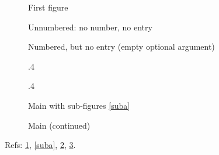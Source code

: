 \documentclass{article}
\begin{document}
\listoffigures
\begin{figure}[h]
  \caption{First figure}\label{first}
\end{figure}
\begin{figure}[h]
  \caption*{Unnumbered: no number, no entry}
\end{figure}
\begin{figure}[h]
  \caption[]{Numbered, but no entry (empty optional argument)}
\end{figure}
\begin{figure}[h]
  \centering
  \begin{subfig}{.4\linewidth}\caption{Sub A}\label{suba}\end{subfig}
  \begin{subfig}{.4\linewidth}\caption{Sub B}\end{subfig}
  \caption{Main with sub-figures \ref{suba}}\label{main}
\end{figure}
\begin{figure}[h]
  \ContinuedFloat
  \caption{Main (continued)}\label{cont}
\end{figure}
Refs: \ref{first}, \ref{suba}, \ref{main}, \ref{cont}.
\end{document}
